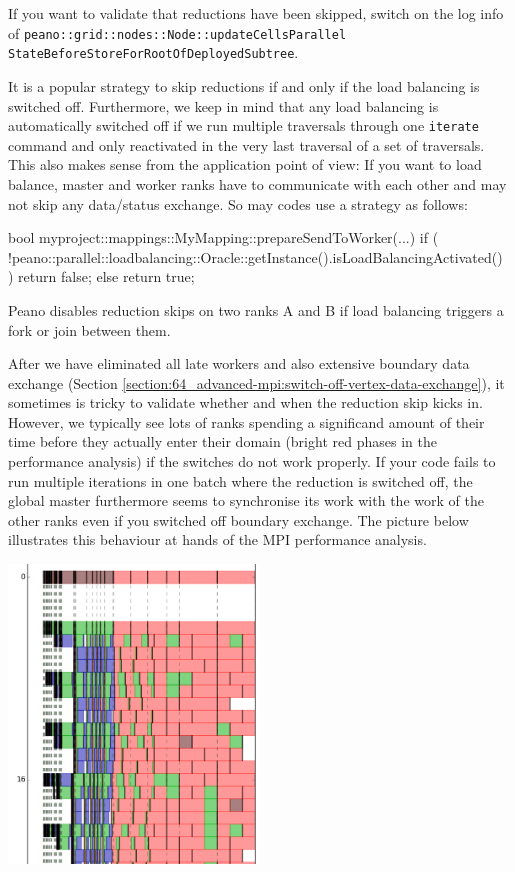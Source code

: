   
\begin{remark}
  If you want to validate that reductions have been skipped, switch on the log
  info of 
  \texttt{peano::grid::nodes::Node::updateCellsParallel}
  \texttt{StateBeforeStoreForRootOfDeployedSubtree}.
\end{remark}

\noindent
It is a popular strategy to skip reductions if and only if the load balancing is
switched off.
Furthermore, we keep in mind that any load balancing is automatically
switched off if we run multiple traversals through one \texttt{iterate} command
and only reactivated in the very last traversal of a set of traversals.
This also makes sense from the application point of view:
If you want to load balance, master and worker ranks have to communicate with
each other and may not skip any data/status exchange.
So may codes use a strategy as follows:

\begin{code}
bool myproject::mappings::MyMapping::prepareSendToWorker(...) {
  if (
    !peano::parallel::loadbalancing::Oracle::getInstance().isLoadBalancingActivated()
  ) {
    return false;
  }
  else return true;
}
\end{code}


\begin{remark}
Peano disables reduction skips on two ranks A and B if load balancing triggers a
fork or join between them. 
\end{remark}


After we have eliminated all late workers and also 
extensive boundary data exchange (Section
\ref{section:64_advanced-mpi:switch-off-vertex-data-exchange}), it sometimes is
tricky to validate whether and when the reduction skip kicks in.
However, we typically see lots of ranks spending a significand amount of their
time before they actually enter their domain (bright red phases in the
performance analysis) if the switches do not work properly. 
If your code fails to run multiple iterations in one batch where the reduction
is switched off, the global master furthermore seems to synchronise its work
with the work of the other ranks even if you switched off boundary exchange.
The picture below illustrates this behaviour at hands of the MPI performance
analysis.

\begin{center}
  \includegraphics[width=0.5\textwidth]{63_mpi-synchronisation/mpi-phases-late-master.png}
\end{center}
